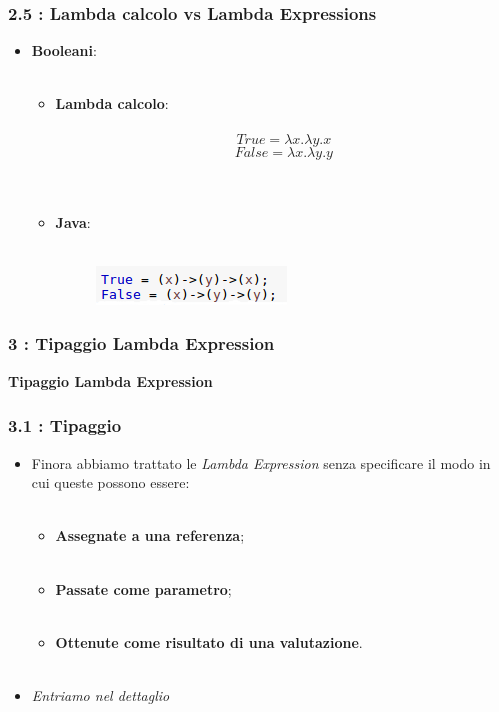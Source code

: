 \documentclass{beamer}
\begin{document}

\begin{frame}
	\frametitle{\textbf{2.5 : Lambda calcolo vs Lambda Expressions}}
	\begin{itemize}
		\item
			\textbf{Booleani}:\\\
			\begin{itemize}
				\item 
					\textbf{Lambda calcolo}:\\\
						\[
							True = \lambda x.\lambda y.x
						\]
						\[
							False = \lambda x.\lambda y.y
						\]\\\
				\item 
					\textbf{Java}:\\\
					\begin{figure}
						\centering
						\includegraphics[width=0.4\linewidth]{image/booleani.png}
						\label{fig:identity}
					\end{figure}
			\end{itemize}	
	\end{itemize}
\end{frame}


\begin{frame}
	\frametitle{\textbf{3 : Tipaggio Lambda Expression}}
	\begin{center}
		\textbf{\Huge Tipaggio Lambda Expression}
	\end{center}
\end{frame}


\begin{frame}
	\frametitle{\textbf{3.1 : Tipaggio}}
	\begin{itemize}
		\item 
			Finora abbiamo trattato le \textit{Lambda Expression} senza specificare il modo in cui queste possono essere:\\\ 
			\begin{itemize}
				\item
					\textbf{Assegnate a una referenza};\\\
				\item
					\textbf{Passate come parametro};\\\
				\item
					\textbf{Ottenute come risultato di una valutazione}.\\\	
			\end{itemize}
		\item
			\textit{Entriamo nel dettaglio}
	\end{itemize}
\end{frame}
\end{document}
